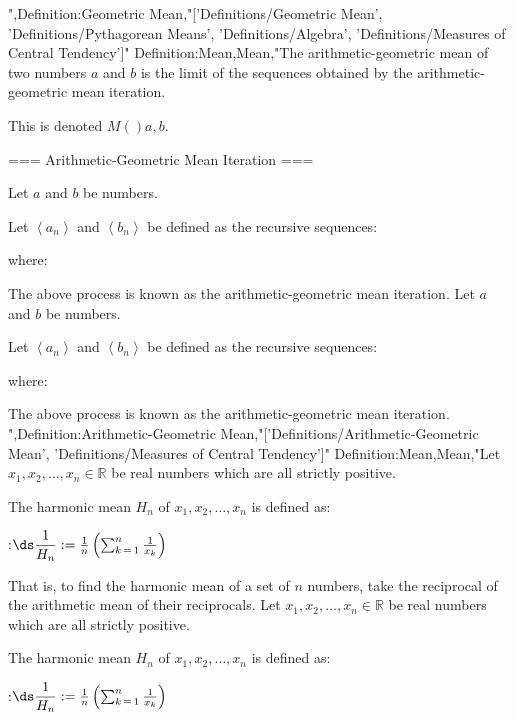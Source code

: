 ",Definition:Geometric Mean,"['Definitions/Geometric Mean', 'Definitions/Pythagorean Means', 'Definitions/Algebra', 'Definitions/Measures of Central Tendency']"
Definition:Mean,Mean,"The arithmetic-geometric mean of two numbers $a$ and $b$ is the limit of the sequences obtained by the arithmetic-geometric mean iteration.

This is denoted $M \left(   \right){a, b}$.


=== Arithmetic-Geometric Mean Iteration ===

Let $a$ and $b$ be numbers.

Let $\left\langle a_n \right\rangle$ and $\left\langle b_n \right\rangle$ be defined as the recursive sequences:







where:






The above process is known as the arithmetic-geometric mean iteration.
Let $a$ and $b$ be numbers.

Let $\left\langle a_n \right\rangle$ and $\left\langle b_n \right\rangle$ be defined as the recursive sequences:







where:






The above process is known as the arithmetic-geometric mean iteration.
",Definition:Arithmetic-Geometric Mean,"['Definitions/Arithmetic-Geometric Mean', 'Definitions/Measures of Central Tendency']"
Definition:Mean,Mean,"Let $x_1, x_2, \ldots, x_n \in \mathbb R$ be real numbers which are all strictly positive.

The harmonic mean $H_n$ of $x_1, x_2, \ldots, x_n$ is defined as:

:$\ds \dfrac 1 {H_n} := \frac 1 n \left( \sum_{k \mathop = 1}^n \frac 1 {x_k}  \right)$

That is, to find the harmonic mean of a set of $n$ numbers, take the reciprocal of the arithmetic mean of their reciprocals.
Let $x_1, x_2, \ldots, x_n \in \mathbb R$ be real numbers which are all strictly positive.

The harmonic mean $H_n$ of $x_1, x_2, \ldots, x_n$ is defined as:

:$\ds \dfrac 1 {H_n} := \frac 1 n \left( \sum_{k \mathop = 1}^n \frac 1 {x_k}  \right)$

